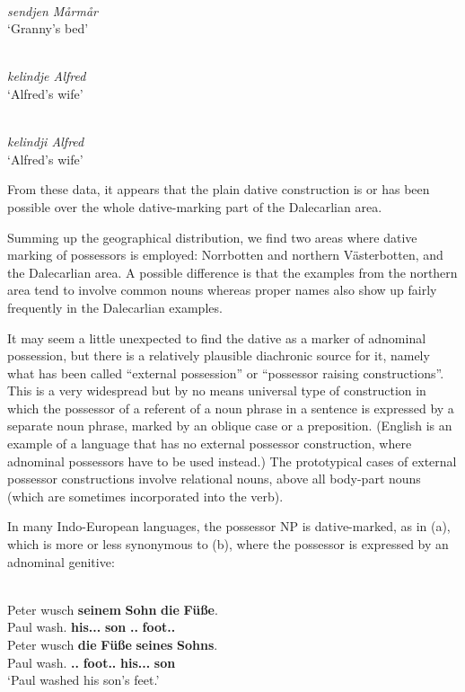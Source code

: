\ea 
\ea 
{}\\
\gl \textit{sendjen Mårmår}\\
\glt ‘Granny’s bed’

\ex 
{}\\
\gl \textit{kelindje Alfred}\\
\glt ‘Alfred’s wife’

\ex 
{}\\
\gl \textit{kelindji Alfred}\\
\glt ‘Alfred’s wife’

\z 
\z



From these data, it appears that the plain dative construction is or has been possible over the whole dative-marking part of the Dalecarlian area. 

Summing up the geographical distribution, we find two areas where dative marking of possessors is employed: Norrbotten and northern Västerbotten, and the Dalecarlian area. A possible difference is that the examples from the northern area tend to involve common nouns whereas proper names also show up fairly frequently in the Dalecarlian examples. 

It may seem a little unexpected to find the dative as a marker of adnominal possession, but there is a relatively plausible diachronic source for it, namely what has been called “external possession” or “possessor raising constructions”. This is a very widespread but by no means universal type of construction in which the possessor of a referent of a noun phrase in a sentence is expressed by a separate noun phrase, marked by an oblique case or a preposition. (English is an example of a language that has no external possessor construction, where adnominal possessors have to be used instead.) The prototypical cases of external possessor constructions involve relational nouns, above all body-part nouns (which are sometimes incorporated into the verb).

In many Indo-European languages, the possessor NP is dative-marked, as in (a), which is more or less synonymous to (b), where the possessor is expressed by an adnominal genitive:

\ea%
\\
\ea 
\gll Peter  wusch  \textbf{seinem} \textbf{Sohn} \textbf{die} \textbf{Füße}.\\
Paul  wash.{\pst}  \textbf{his.{\dat}.{\m}.{\sg}} \textbf{son} \textbf{{}.{\nom}.{\pl}} \textbf{foot.{\nom}.{\pl}}\\
\ex 
\gll Peter  wusch  \textbf{die} \textbf{Füße} \textbf{seines} \textbf{Sohns}.\\
Paul  wash.{\pst}  \textbf{{}.{\nom}.{\pl}} \textbf{foot.{\nom}.{\pl}} \textbf{his.{\dat}.{\m}.{\sg}} \textbf{son}\\
\glt ‘Paul washed his son’s feet.’
\z
\z 

